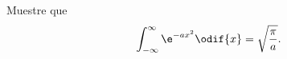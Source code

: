 \documentclass[../main.tex]{subfiles}
\begin{document}
\begin{problema}[10]
	Muestre que
	\begin{equation*}
		\int_{-\infty}^{\infty} \e^{-ax^{2}} \odif{x} = \sqrt{\dfrac{\pi}{a}}.
	\end{equation*}
\end{problema}
\end{document}

